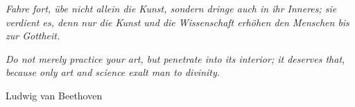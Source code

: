 \documentclass[11pt, a4paper, doubleside]{Thesis}
\title{\ttitle} %
\begin{document}
\frontmatter %


\fancyhead{} %
\rhead{\thepage} %
\lhead{} %

\pagestyle{fancy} %

\newcommand{\HRule}{\rule{\linewidth}{0.5mm}} %

\hypersetup{pdfsubject=\subjectname}
\hypersetup{pdfauthor=\authornames}
\hypersetup{pdfkeywords=\keywordnames}




\pagestyle{empty} %

\null\vfill %
\begin{flushright}
\textit{Fahre fort, übe nicht allein die Kunst, sondern dringe auch in ihr Inneres; sie verdient es, denn nur die Kunst und die Wissenschaft erhöhen den Menschen bis zur Gottheit.
}
\end{flushright}
\begin{flushright}
\textit{Do not merely practice your art, but penetrate into its interior; it deserves that, because only art and science exalt man to divinity.
}
\end{flushright}


\begin{flushright}
Ludwig van Beethoven
\end{flushright}

\vfill\vfill\vfill\vfill\vfill\vfill\null %
\clearpage
\end{document}
